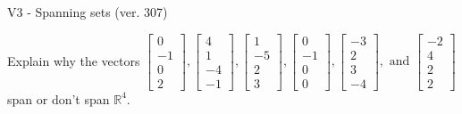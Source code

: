 \begin{exercise}
  \begin{exerciseTitle}V3 - Spanning sets (ver. 307)\end{exerciseTitle}
  \begin{exerciseStatement}
    Explain why the vectors \(\left[\begin{array}{r}
0 \\
-1 \\
0 \\
2
\end{array}\right] , \left[\begin{array}{r}
4 \\
1 \\
-4 \\
-1
\end{array}\right] , \left[\begin{array}{r}
1 \\
-5 \\
2 \\
3
\end{array}\right] , \left[\begin{array}{r}
0 \\
-1 \\
0 \\
0
\end{array}\right] , \left[\begin{array}{r}
-3 \\
2 \\
3 \\
-4
\end{array}\right] , \text{ and } \left[\begin{array}{r}
-2 \\
4 \\
2 \\
2
\end{array}\right]\) span or don't span \(\mathbb{R}^4\). 
	



\end{exerciseStatement}
\end{exercise}
